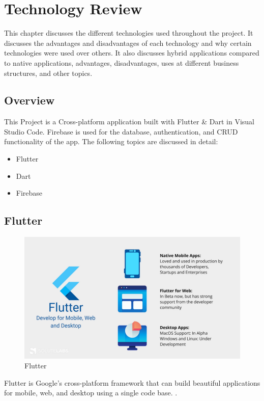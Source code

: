 \chapter{Technology Review}
This chapter discusses the different technologies used throughout the project. It discusses the advantages and disadvantages of each technology and why certain technologies were used over others. It also discusses hybrid applications compared to native applications, advantages, disadvantages, uses at different business structures, and other topics.

\section{Overview}
This Project is a Cross-platform application built with Flutter \& Dart in Visual Studio Code. Firebase is used for the database, authentication, and CRUD functionality of the app.
The following topics are discussed in detail:

\begin{itemize}
\item Flutter
\item Dart
\item Firebase
\end{itemize}

\section{Flutter}
\begin{figure}[!htb]
    \centering
    \includegraphics[scale=0.15]{img/Flutter.png}
    \caption{Flutter}
    \label{fig:Flutter}
\end{figure}
Flutter is Google's cross-platform framework that can build beautiful applications for mobile, web, and desktop using a single code base. \cite{FlutterGoogle:online}.
